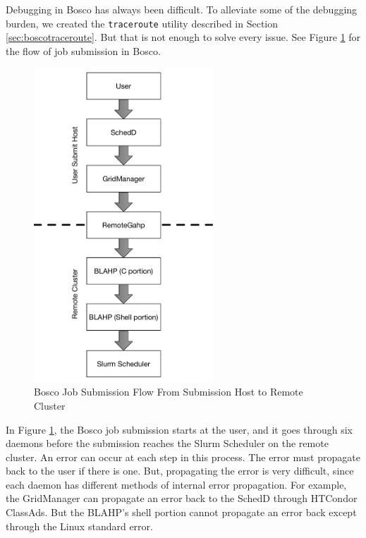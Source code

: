 Debugging in Bosco has always been difficult.  To alleviate some of the debugging burden, we created the \texttt{traceroute} utility described in Section \ref{sec:boscotraceroute}.  But that is not enough to solve every issue.  See Figure \ref{fig:boscojobsubmitflowconclusion} for the flow of job submission in Bosco.

\begin{figure}[h!t]
	\centering
	\includegraphics[width=0.6\textwidth]{images/JobSubmitFlow.pdf}
	\caption{Bosco Job Submission Flow From Submission Host to Remote Cluster}
	\label{fig:boscojobsubmitflowconclusion}
\end{figure}

In Figure \ref{fig:boscojobsubmitflowconclusion}, the Bosco job submission starts at the user, and it goes through six daemons before the submission reaches the Slurm Scheduler on the remote cluster.  An error can occur at each step in this process.  The error must propagate back to the user if there is one.  But, propagating the error is very difficult, since each daemon has different methods of internal error propagation.  For example, the GridManager can propagate an error back to the SchedD through HTCondor ClassAds.  But the BLAHP's shell portion cannot propagate an error back except through the Linux standard error.

